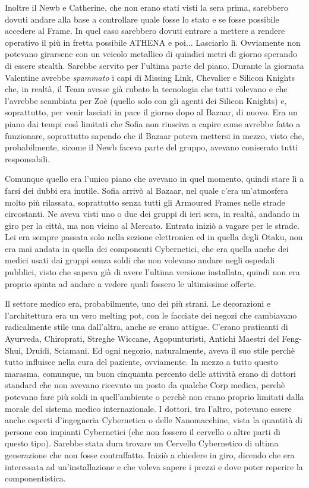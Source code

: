     Inoltre il Newb e Catherine, che non erano stati visti la sera prima, sarebbero dovuti andare alla base a
    controllare quale fosse lo stato e se fosse possibile accedere al Frame. In quel caso sarebbero dovuti entrare a
    mettere a rendere operativo il più in fretta possibile ATHENA e poi... Lasciarlo lì. Ovviamente non potevano
    girarsene con un veicolo metallico di quindici metri di giorno sperando di essere stealth. Sarebbe servito per
    l'ultima parte del piano. Durante la giornata Valentine avrebbe \emph{spammato} i capi di Missing Link, Chevalier e
    Silicon Knights che, in realtà, il Team avesse già rubato la tecnologia che tutti volevano e che l'avrebbe scambiata
    per Zoè (quello solo con gli agenti dei Silicon Knights) e, soprattutto, per venir lasciati in pace il giorno dopo
    al Bazaar, di nuovo. Era un piano dai tempi così limitati che Sofia non riusciva a capire come avrebbe fatto a
    funzionare, soprattutto sapendo che il Bazaar poteva mettersi in mezzo, visto che, probabilmente, sicome il Newb
    faceva parte del gruppo, avevano coniserato tutti responsabili.

    Comunque quello era l'unico piano che avevano in quel momento, quindi stare lì a farsi dei dubbi era inutile. Sofia
    arrivò al Bazaar, nel quale c'era un'atmosfera molto più rilassata, soprattutto senza tutti gli Armoured Frames
    nelle strade circostanti. Ne aveva visti uno o due dei gruppi di ieri sera, in realtà, andando in giro per la città,
    ma non vicino al Mercato. Entrata iniziò a vagare per le strade. Lei era sempre passata solo nella sezione
    elettronica ed in quella degli Otaku, non era mai andata in quella dei componenti Cybernetici, che era quella anche
    dei medici usati dai gruppi senza soldi che non volevano andare negli ospedali pubblici, visto che sapeva già di
    avere l'ultima versione installata, quindi non era proprio spinta ad andare a vedere quali fossero le ultimissime
    offerte.

    Il settore medico era, probabilmente, uno dei più strani. Le decorazioni e l'architettura era un vero melting pot,
    con le facciate dei negozi che cambiavano radicalmente stile una dall'altra, anche se erano attigue. C'erano
    praticanti di Ayurveda, Chiroprati, Streghe Wiccane, Agopunturisti, Antichi Maestri del Feng-Shui, Druidi,
    Sciamani. Ed ogni negozio, naturalmente, aveva il suo stile perchè tutto influisce nella cura del paziente,
    ovviamente. In mezzo a tutto questo marasma, comunque, un buon cinquanta percento delle attività erano di dottori
    standard che non avevano ricevuto un posto da qualche Corp medica, perchè potevano fare più soldi in quell'ambiente
    o perchè non erano proprio limitati dalla morale del sistema medico internazionale. I dottori, tra l'altro, potevano
    essere anche esperti d'ingegneria Cybernetica o delle Nanomacchine, vista la quantità di persone con impianti
    Cybernetici (che non fossero il cervello o altre parti di questo tipo). Sarebbe stata dura trovare un Cervello
    Cybernetico di ultima generazione che non fosse contraffatto. Iniziò a chiedere in giro, dicendo che era interessata
    ad un'installazione e che voleva sapere i prezzi e dove poter reperire la componentistica.


